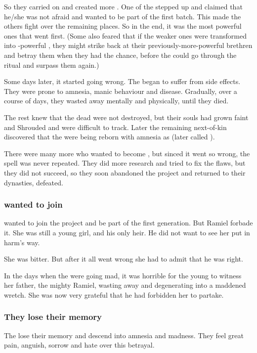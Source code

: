 So they carried on and created more \malachim. 
One of the \satharioth{} stepped up and claimed that he/she was not afraid and wanted to be part of the first batch. 
This made the others fight over the remaining places. 
So in the end, it was the most powerful ones that went first. 
(Some also feared that if the weaker ones were transformed into \uber-powerful \malachim, they might strike back at their previously-more-powerful brethren and betray them when they had the chance, before the \satharioth{} could go through the ritual and surpass them again.)

Some days later, it started going wrong. 
The \malachim{} began to suffer from side effects. 
They were prone to amnesia, manic behaviour and disease. 
Gradually, over a course of days, they wasted away mentally and physically, until they died. 

The rest knew that the dead \malachim{} were not destroyed, but their souls had grown faint and Shrouded and were difficult to track. 
Later the remaining next-of-kin discovered that the \malachim{} were being reborn with amnesia as \humans{} (later called ). 

There were many more who wanted to become \malachim, but sinced it went so wrong, the spell was never repeated. 
They did more research and tried to fix the flaws, but they did not succeed, so they soon abandoned the project and returned to their dynasties, defeated. 





\subsubsection{\Cishiel{} wanted to join}
 wanted to join the \malach{} project and be part of the first generation. 
But Ramiel forbade it. 
She was still a young girl, and his only heir. 
He did not want to see her put in harm's way. 

She was bitter. 
But after it all went wrong she had to admit that he was right. 

In the days when the \malachim{} were going mad, it was horrible for the young \Cishiel{} to witness her father, the mighty Ramiel, wasting away and degenerating into a maddened wretch. 
She was now very grateful that he had forbidden her to partake. 





\subsubsection{They lose their memory}
The \malachim{} lose their memory and descend into amnesia and madness. 
They feel great pain, anguish, sorrow and hate over this betrayal.

